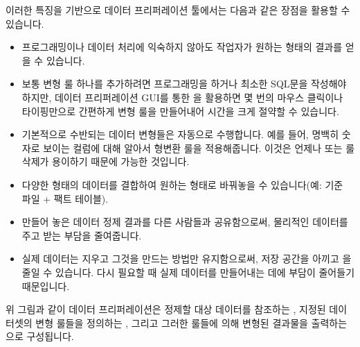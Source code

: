 \documentclass[letterpaper,10pt,english]{sphinxmanual}
\begin{document}
이러한 특징을 기반으로 데이터 프리퍼레이션 툴에서는 다음과 같은 장점을 활용할 수 있습니다.
\begin{itemize}
\item {} 
프로그래밍이나 데이터 처리에 익숙하지 않아도 작업자가 원하는 형태의 결과를 얻을 수 있습니다.

\item {} 
보통 변형 룰 하나를 추가하려면 프로그래밍을 하거나 최소한 SQL문을 작성해야하지만, 데이터 프리퍼레이션 GUI를 통한 을 활용하면 몇 번의 마우스 클릭이나 타이핑만으로 간편하게 변형 룰을 만들어내어 시간을 크게 절약할 수 있습니다.

\item {} 
기본적으로 수반되는 데이터 변형들은 자동으로 수행합니다. 예를 들어, 명백히 숫자로 보이는 컬럼에 대해 알아서 형변환 룰을 적용해줍니다. 이것은 언제나  또는 룰 삭제가 용이하기 때문에 가능한 것입니다.

\item {} 
다양한 형태의 데이터를 결합하여 원하는 형태로 바꿔놓을 수 있습니다(예: 기준 파일 + 팩트 테이블).

\item {} 
만들어 놓은 데이터 정제 결과를 다른 사람들과 공유함으로써, 물리적인 데이터를 주고 받는 부담을 줄여줍니다.

\item {} 
실제 데이터는 지우고 그것을 만드는 방법만 유지함으로써, 저장 공간을 아끼고 을 줄일 수 있습니다. 다시 필요할 때 실제 데이터를 만들어내는 데에 부담이 줄어들기 때문입니다.

\end{itemize}

\begin{quote}

\begin{figure}[H]
\centering

\noindent{}
\end{figure}
\end{quote}

위 그림과 같이 데이터 프리퍼레이션은 정제할 대상 데이터를 참조하는 , 지정된 데이터셋의 변형 룰들을 정의하는 , 그리고 그러한 룰들에 의해 변형된 결과물을 출력하는 으로 구성됩니다.
\end{document}
